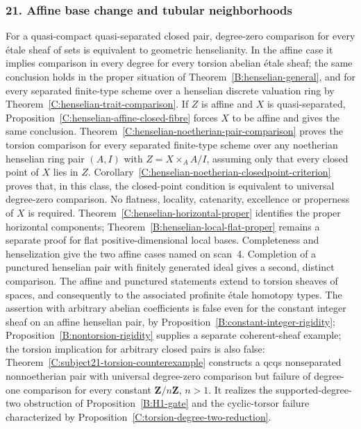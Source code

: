\subsubsection{21. Affine base change and tubular neighborhoods}
\begin{corollary}\label{B:subject21}
For a quasi-compact quasi-separated closed pair, degree-zero comparison for every \'etale sheaf of sets is equivalent to geometric henselianity. In the affine case it implies comparison in every degree for every torsion abelian \'etale sheaf; the same conclusion holds in the proper situation of Theorem~\ref{B:henselian-general}, and for every separated finite-type scheme over a henselian discrete valuation ring by Theorem~\ref{C:henselian-trait-comparison}. If $Z$ is affine and $X$ is quasi-separated, Proposition~\ref{C:henselian-affine-closed-fibre} forces $X$ to be affine and gives the same conclusion. Theorem~\ref{C:henselian-noetherian-pair-comparison} proves the torsion comparison for every separated finite-type scheme over any noetherian henselian ring pair $(A,I)$ with $Z=X\times_A A/I$, assuming only that every closed point of $X$ lies in $Z$. Corollary~\ref{C:henselian-noetherian-closedpoint-criterion} proves that, in this class, the closed-point condition is equivalent to universal degree-zero comparison. No flatness, locality, catenarity, excellence or properness of $X$ is required. Theorem~\ref{C:henselian-horizontal-proper} identifies the proper horizontal components; Theorem~\ref{B:henselian-local-flat-proper} remains a separate proof for flat positive-dimensional local bases. Completeness and henselization give the two affine cases named on scan~4. Completion of a punctured henselian pair with finitely generated ideal gives a second, distinct comparison. The affine and punctured statements extend to torsion sheaves of spaces, and consequently to the associated profinite \'etale homotopy types. The assertion with arbitrary abelian coefficients is false even for the constant integer sheaf on an affine henselian pair, by Proposition~\ref{B:constant-integer-rigidity}; Proposition~\ref{B:nontorsion-rigidity} supplies a separate coherent-sheaf example; the torsion implication for arbitrary closed pairs is also false: Theorem~\ref{C:subject21-torsion-counterexample} constructs a qcqs nonseparated nonnoetherian pair with universal degree-zero comparison but failure of degree-one comparison for every constant $\mathbf Z/n\mathbf Z$, $n>1$. It realizes the supported-degree-two obstruction of Proposition~\ref{B:H1-gate} and the cyclic-torsor failure characterized by Proposition~\ref{C:torsion-degree-two-reduction}.
\end{corollary}
